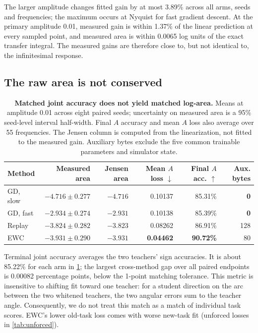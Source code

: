 The larger amplitude changes fitted gain by at most 3.89\% across all arms, seeds and frequencies; the maximum occurs at Nyquist for fast gradient descent. At the primary amplitude 0.01, measured gain is within 1.37\% of the linear prediction at every sampled point, and measured area is within 0.0065 log units of the exact transfer integral. The measured gains are therefore close to, but not identical to, the infinitesimal response.

\subsection{The raw area is not conserved}

\begin{table}[!t]
  \centering
  \small
  \setlength{\tabcolsep}{4pt}
  \caption{\textbf{Matched joint accuracy does not yield matched log-area.}
  Means at amplitude 0.01 across eight paired seeds; uncertainty on measured area is a 95\% seed-level interval half-width. Final \(A\) accuracy and mean \(A\) loss also average over 55 frequencies. The Jensen column is computed from the linearization, not fitted to the measured gain. Auxiliary bytes exclude the five common trainable parameters and simulator state.}
  \label{tab:main}
  \begin{tabular}{lrrrrr}
    \toprule
    Method & Measured area & Jensen area & Mean \(A\) loss \(\downarrow\) & Final \(A\) acc. \(\uparrow\) & Aux. bytes \\
    \midrule
    GD, slow & \(-4.716\pm0.277\) & \(-4.716\) & 0.10137 & 85.31\% & \textbf{0} \\
    GD, fast & \(-2.934\pm0.274\) & \(-2.931\) & 0.10138 & 85.39\% & \textbf{0} \\
    Replay & \(-3.824\pm0.282\) & \(-3.823\) & 0.08262 & 86.91\% & 128 \\
    EWC & \(-3.931\pm0.290\) & \(-3.931\) & \textbf{0.04462} & \textbf{90.72\%} & 80 \\
    \bottomrule
  \end{tabular}
\end{table}

Terminal joint accuracy averages the two teachers' sign accuracies. It is about 85.22\% for each arm in \cref{tab:main}; the largest cross-method gap over all paired endpoints is 0.00082 percentage points, below the 1-point matching tolerance. This metric is insensitive to shifting fit toward one teacher: for a student direction on the arc between the two whitened teachers, the two angular errors sum to the teacher angle. Consequently, we do not treat this match as a match of individual task scores. EWC's lower old-task loss comes with worse new-task fit (unforced losses in \cref{tab:unforced}).

